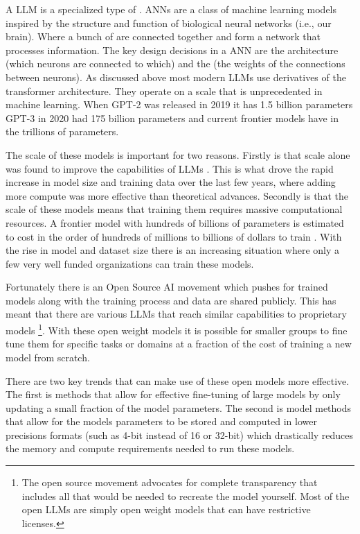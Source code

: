 A LLM is a specialized type of . ANNs are a class of machine learning models inspired by the structure and function of biological neural networks (i.e., our brain). Where a bunch of  are connected together and form a network that processes information. The key design decisions in a ANN are the architecture (which neurons are connected to which) and the  (the weights of the connections between neurons). As discussed above most modern LLMs use derivatives of the transformer architecture. They operate on a scale that is unprecedented in machine learning. When GPT-2 was released in 2019 it has 1.5 billion parameters \cite{radfordLanguageModelsAre2019} GPT-3 in 2020 had 175 billion parameters \cite{brownLanguageModelsAre2020} and current frontier models have in the trillions of parameters.

The scale of these models is important for two reasons. Firstly is that scale alone was found to improve the capabilities of LLMs \cite{kaplanScalingLawsNeural2020}. This is what drove the rapid increase in model size and training data over the last few years, where adding more compute was more effective than theoretical advances. Secondly is that the scale of these models means that training them requires massive computational resources. A frontier model with hundreds of billions of parameters is estimated to cost in the order of hundreds of millions to billions of dollars to train \cite{cottierRisingCostsTraining2024}. With the rise in model and dataset size there is an increasing situation where only a few very well funded organizations can train these models.

Fortunately there is an Open Source AI movement \cite{OpenSourceAI} which pushes for trained models along with the training process and data are shared publicly. This has meant that there are various  LLMs that reach similar capabilities to proprietary models \cite{shaoDeepSeekMathPushingLimits2024,teamGLM45AgenticReasoning2025a} \footnote{The open source movement advocates for complete transparency that includes all that would be needed to recreate the model yourself. Most of the open LLMs are simply open weight models that can have restrictive licenses.}. With these open weight models it is possible for smaller groups to fine tune them for specific tasks or domains at a fraction of the cost of training a new model from scratch.

There are two key trends that can make use of these open models more effective. The first is  methods \cite{huLoRALowRankAdaptation2021} that allow for effective fine-tuning of large models by only updating a small fraction of the model parameters. The second is model  methods \cite{dettmersQLoRAEfficientFinetuning2023,frantarGPTQAccuratePostTraining2023, xiaoSmoothQuantAccurateEfficient2024,linAWQActivationawareWeight2024,cheeQuIP2BitQuantization2024} that allow for the models parameters to be stored and computed in lower precisions formats (such as 4-bit instead of 16 or 32-bit) which drastically reduces the memory and compute requirements needed to run these models.

